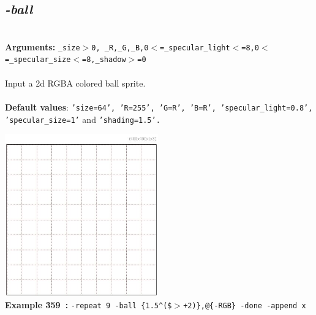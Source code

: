 \documentclass[a4paper,11pt,twoside]{book}
\begin{document}
\subsection{\emph{-ball} }\vspace*{-0.5em}
~\\\textbf{Arguments: } 
{\small \texttt{\_size$>$0, \_R,\_G,\_B,0$<$=\_specular\_light$<$=8,0$<$=\_specular\_size$<$=8,\_shadow$>$=0}}\\~\\
Input a 2d RGBA colored ball sprite.
~\\~\\\textbf{Default values}: {\small \texttt{'size=64', 'R=255', 'G=R', 'B=R', 'specular\_light=0.8', 'specular\_size=1'} and \texttt{'shading=1.5'.}}
\begin{center}\includegraphics[keepaspectratio=true,height=7cm,width=\textwidth]{img/gmic_def359.jpg}\\
{\footnotesize \textbf{Example 359~:} \texttt{-repeat 9 -ball \{1.5\textasciicircum (\$$>$+2)\},@\{-RGB\} -done -append x}}
\end{center}
\end{document}
